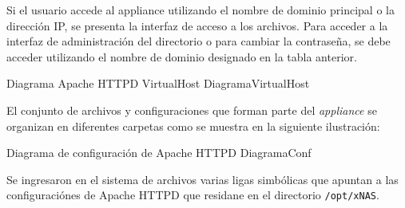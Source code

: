 Si el usuario accede al appliance utilizando el nombre de dominio principal o la dirección IP, se presenta la interfaz de acceso a los archivos. Para acceder a la interfaz de administración del directorio o para cambiar la contraseña, se debe acceder utilizando el nombre de dominio designado en la tabla anterior.

\diagramblock
{Diagrama Apache HTTPD VirtualHost}
{DiagramaVirtualHost}
{
 {
  
 }
}

El conjunto de archivos y configuraciones que forman parte del \textit{appliance} se organizan en diferentes carpetas como se muestra en la siguiente ilustraci\'{o}n:

\diagramblock
{Diagrama de configuraci\'{o}n de Apache HTTPD}
{DiagramaConf}
{
 {
  
 }
}

Se ingresaron en el sistema de archivos varias ligas simb\'{o}licas que apuntan a las configuraci\'{o}nes de Apache \textsc{HTTPD} que residane en el directorio \texttt{/opt/xNAS}.

